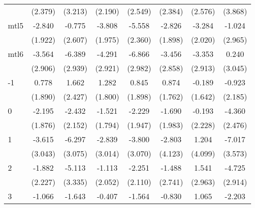 \documentclass{article}
\begin{document}
{\begin{longtable}{l*{7}{c}}
                &  (2.379)         &  (3.213)         &  (2.190)         &  (2.549)         &  (2.384)         &  (2.576)         &  (3.868)         \\
mtl5            &   -2.840         &   -0.775         &   -3.808         &   -5.558\sym{*}  &   -2.826         &   -3.284         &   -1.024         \\
                &  (1.922)         &  (2.607)         &  (1.975)         &  (2.360)         &  (1.898)         &  (2.020)         &  (2.965)         \\
mtl6            &   -3.564         &   -6.389\sym{*}  &   -4.291         &   -6.866\sym{*}  &   -3.456         &   -3.353         &    0.240         \\
                &  (2.906)         &  (2.939)         &  (2.921)         &  (2.982)         &  (2.858)         &  (2.913)         &  (3.045)         \\
-1              &    0.778         &    1.662         &    1.282         &    0.845         &    0.874         &   -0.189         &   -0.923         \\
                &  (1.890)         &  (2.427)         &  (1.800)         &  (1.898)         &  (1.762)         &  (1.642)         &  (2.185)         \\
0               &   -2.195         &   -2.432         &   -1.521         &   -2.229         &   -1.690         &   -0.193         &   -4.360         \\
                &  (1.876)         &  (2.152)         &  (1.794)         &  (1.947)         &  (1.983)         &  (2.228)         &  (2.476)         \\
1               &   -3.615         &   -6.297         &   -2.839         &   -3.800         &   -2.803         &    1.204         &   -7.017         \\
                &  (3.043)         &  (3.075)         &  (3.014)         &  (3.070)         &  (4.123)         &  (4.099)         &  (3.573)         \\
2               &   -1.882         &   -5.113         &   -1.113         &   -2.251         &   -1.488         &    1.541         &   -4.725         \\
                &  (2.227)         &  (3.335)         &  (2.052)         &  (2.110)         &  (2.741)         &  (2.963)         &  (2.914)         \\
3               &   -1.066         &   -1.643         &   -0.407         &   -1.564         &   -0.830         &    1.065         &   -2.203         \\

\end{longtable}}
\end{document}
